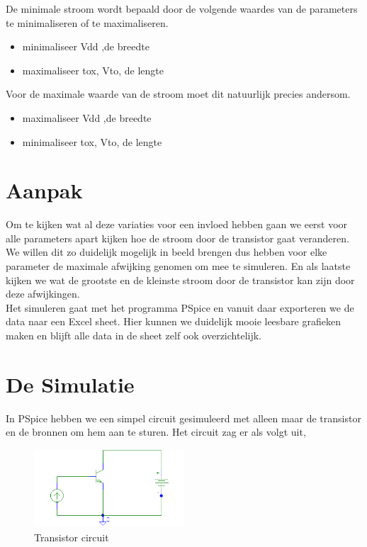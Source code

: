 \documentclass{article}
\begin{document}
De minimale stroom wordt bepaald door de volgende waardes van de  parameters te minimaliseren of te maximaliseren.
\begin{itemize}
	\item minimaliseer Vdd ,de breedte
	\item maximaliseer tox, Vto, de lengte
\end{itemize}

Voor de maximale waarde van de stroom moet dit natuurlijk precies andersom.

\begin{itemize}
	\item maximaliseer Vdd ,de breedte
	\item  minimaliseer tox, Vto, de lengte
\end{itemize}


\section{Aanpak}

Om te kijken wat al deze variaties voor een invloed hebben gaan we eerst voor alle parameters apart kijken hoe de stroom door de transistor gaat veranderen. We willen dit zo duidelijk mogelijk in beeld brengen dus hebben voor elke parameter de maximale afwijking genomen om mee te simuleren. En als laatste kijken we wat de grootste en de kleinste stroom door de transistor kan zijn door deze afwijkingen.\\
Het simuleren gaat met het programma PSpice en vanuit daar exporteren we de data naar een Excel sheet. Hier kunnen we duidelijk mooie leesbare grafieken maken en blijft alle data in de sheet zelf ook overzichtelijk.

\clearpage

\section{De Simulatie}
 
In PSpice hebben we een simpel circuit gesimuleerd met alleen maar de transistor en de bronnen om hem aan te sturen. Het circuit zag er als volgt uit,

\begin{figure}[H]
	\centering
	\includegraphics[width=0.5\textwidth]{transistorsim}
	\caption {Transistor circuit}
\end{figure}
\end{document}
